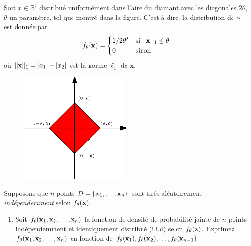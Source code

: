\documentclass[11pt,french,english]{article}
\begin{document}
\begin{enumerate}
{Soit $x\in \mathbb{R}^2$ distribué uniformément dans l'aire du diamant avec les diagonales $2\theta$, $\theta$ un paramètre, tel que montré dans la figure. C'est-à-dire, la distribution de $\mathbf{x}$ est donnée par
$$
f_\theta(\mathbf{x}) = \begin{cases}
1/2\theta^2&\text{si } ||\mathbf{x}||_1 \leq \theta\\
0&\text{sinon}
\end{cases}
$$
où $||\mathbf{x}||_1 = |x_1| + |x_2|$ est la norme $\ell_1$ de $\mathbf{x}$.
}

\begin{figure}[ht]
\centering
\includegraphics[width = 0.5\textwidth]{diamond.eps}
\end{figure}

{Supposons que $n$ points $D=\{ \mathbf{x}_1, \dots, \mathbf{x}_n\}$ sont tirés aléatoirement \emph{indépendemment} selon $f_\theta(\mathbf{x})$.}

\begin{enumerate}

\item {}
{Soit $f_\theta(\mathbf{x}_1, \mathbf{x}_2, \ldots, \mathbf{x}_n)$ la fonction de densité de probabilité jointe de $n$ points indépendemment et identiquement distribué (i.i.d) selon $f_\theta(\mathbf{x})$.
Exprimez $f_\theta(\mathbf{x}_1, \mathbf{x}_2, \ldots, \mathbf{x}_n)$ en fonction de $f_\theta(\mathbf{x}_1), f_\theta(\mathbf{x}_2), \ldots, f_\theta(\mathbf{x}_{n-1})$}


\end{enumerate}
\end{enumerate}
\end{document}
